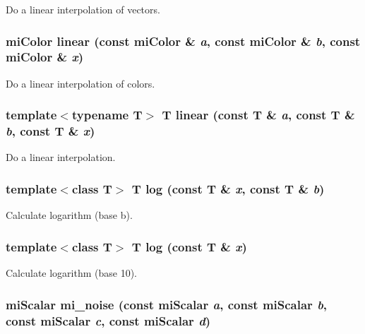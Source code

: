 Do a linear interpolation of vectors. 

\subsubsection{\setlength{\rightskip}{0pt plus 5cm}mi\-Color linear (const mi\-Color \& {\em a}, const mi\-Color \& {\em b}, const mi\-Color \& {\em x})\hspace{0.3cm}{\tt  [inline]}}\label{namespacersl_a9}


Do a linear interpolation of colors. 

\subsubsection{\setlength{\rightskip}{0pt plus 5cm}template$<$typename T$>$ T linear (const T \& {\em a}, const T \& {\em b}, const T \& {\em x})\hspace{0.3cm}{\tt  [inline]}}\label{namespacersl_a8}


Do a linear interpolation. 

\subsubsection{\setlength{\rightskip}{0pt plus 5cm}template$<$class T$>$ T log (const T \& {\em x}, const T \& {\em b})\hspace{0.3cm}{\tt  [inline]}}\label{namespacersl_a37}


Calculate logarithm (base b). 

\subsubsection{\setlength{\rightskip}{0pt plus 5cm}template$<$class T$>$ T log (const T \& {\em x})\hspace{0.3cm}{\tt  [inline]}}\label{namespacersl_a36}


Calculate logarithm (base 10). 

\subsubsection{\setlength{\rightskip}{0pt plus 5cm}mi\-Scalar mi\_\-noise (const mi\-Scalar {\em a}, const mi\-Scalar {\em b}, const mi\-Scalar {\em c}, const mi\-Scalar {\em d})\hspace{0.3cm}{\tt  [inline]}}\label{namespacersl_a50}


